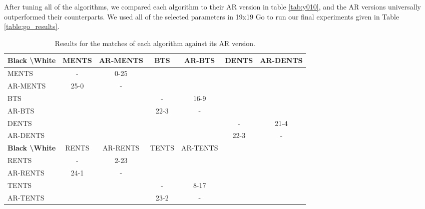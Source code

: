 \documentclass{article}
\theoremstyle{plain}
\begin{document}
\begin{appendices}
            
            
            
            
            
            
            After tuning all of the algorithms, we compared each algorithm to their AR version in table \ref{tab:y010}, and the AR versions universally outperformed their counterparts. We used all of the selected parameters in 19x19 Go to run our final experiments given in Table \ref{table:go_results}.
            
            
            
            \begin{table*}[]
            \centering
                \begin{tabular}{l|cccccc}
                    \textbf{Black \textbackslash White}     & MENTS     & AR-MENTS  & BTS       & AR-BTS    & DENTS     & AR-DENTS  \\ 
                    \hline
                                            MENTS           &   -       & 0-25      &           &           &           &           \\
                                            AR-MENTS        & 25-0      &   -       &           &           &           &           \\
                                            BTS             &           &           &   -       & 16-9      &           &           \\
                                            AR-BTS          &           &           & 22-3      &   -       &           &           \\
                                            DENTS           &           &           &           &           &   -       & 21-4      \\
                                            AR-DENTS        &           &           &           &           & 22-3      & -         \\      
                    \hline
                    \textbf{Black \textbackslash White}     & RENTS     & AR-RENTS  & TENTS     & AR-TENTS  &           &           \\ 
                    \hline
                                            RENTS           &   -       & 2-23      &           &           &           &           \\
                                            AR-RENTS        & 24-1      &   -       &           &           &           &           \\
                                            TENTS           &           &           &   -       & 8-17      &           &           \\
                                            AR-TENTS        &           &           & 23-2      & -         &           &           \\         
                \end{tabular}
                \caption{Results for the matches of each algorithm against its AR version.\label{tab:y10}}
            \end{table*}
            

\end{appendices}
\end{document}
